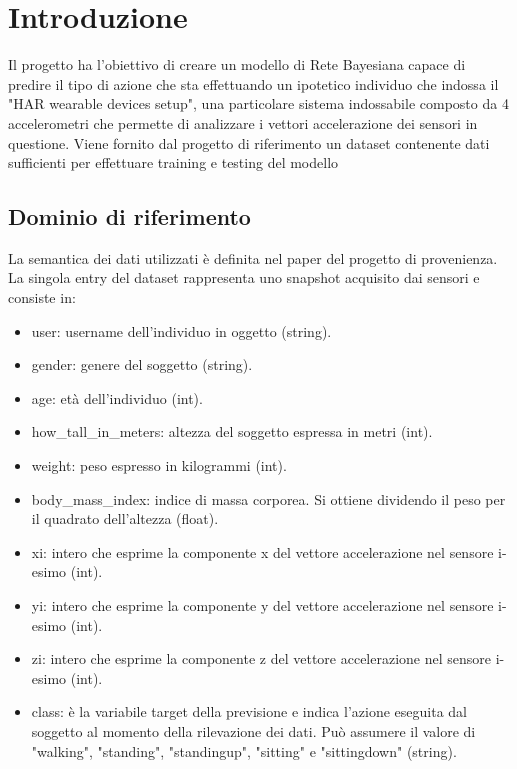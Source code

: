 \documentclass[12pt]{article}
\begin{document}

\tableofcontents
\pagebreak




\section{Introduzione}
Il progetto ha l'obiettivo di creare un modello di Rete Bayesiana capace di predire il tipo di azione che sta effettuando un ipotetico individuo che indossa il "HAR wearable devices setup", una particolare sistema indossabile composto da 4 accelerometri che permette di analizzare i vettori accelerazione dei sensori in questione. Viene fornito dal progetto di riferimento\cite{HAR} un dataset contenente dati sufficienti per effettuare training e testing del modello

\subsection{Dominio di riferimento}
La semantica dei dati utilizzati è definita nel paper\cite{Paper} del progetto di provenienza. La singola entry del dataset rappresenta uno snapshot acquisito dai sensori e consiste in:
\begin{itemize}
	\item user: username dell'individuo in oggetto (string).
	\item gender: genere del soggetto (string).
	\item age: età dell'individuo (int).
	\item how\_tall\_in\_meters: altezza del soggetto espressa in metri (int).
	\item weight: peso espresso in kilogrammi (int).
	\item body\_mass\_index: indice di massa corporea. Si ottiene dividendo il peso per il quadrato dell'altezza (float).
	\item xi: intero che esprime la componente x del vettore accelerazione nel sensore i-esimo (int).
	\item yi: intero che esprime la componente y del vettore accelerazione nel sensore i-esimo (int).
	\item zi: intero che esprime la componente z del vettore accelerazione nel sensore i-esimo (int).
	\item class: è la variabile target della previsione e indica l'azione eseguita dal soggetto al momento della rilevazione dei dati. Può assumere il valore di "walking", "standing", "standingup", "sitting" e "sittingdown" (string).
\end{itemize}
\end{document}
